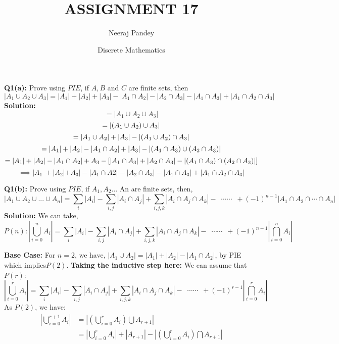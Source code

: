\documentclass{article}
\title{ASSIGNMENT 17}
\author{Neeraj Pandey}
\date{Discrete Mathematics}
\begin{document}
\maketitle
\begin{flushleft}
	\newcommand\tab[1][1cm]{\hspace*{#1}}
	\textbf{Q1(a): }Prove using $PIE$, if $A,B$ and $C$ are finite sets, then
	\[ | A_{1} \cup A_{2} \cup A_{3} | = | A_{1} | + | A_{2} | + | A_{3} | - | A_{1} \cap A_{2} | - | A_{2} \cap A_{3} | - | A_{1} \cap A_{3} | + | A_{1} \cap A_{2} \cap A_{3} | \]
	\newline
	\newline
	\textbf{Solution: } \[ = |A_{1} \cup A_{2} \cup A_{3} |\]
	\[= | \small( A_{1} \cup A_{2} \small) \cup A_{3} |\]
	\[= | A_{1} \cup A_{2} | + | A_{3} | - | \small( A_{1} \cup A_{2} \small) \cap A_{3} |\]
	\[= |A_{1}| + |A_{2}| - |A_{1} \cap A_{2}| + |A_{3}| - | \small( A_{1} \cap A_{3} \small) \cup\small( A_{2} \cap A_{3} \small)| \]
	\[= |A_{1}| + |A_{2}| - |A_{1} \cap A_{2}| + A_{3} - \small[ |A_{1} \cap A_{3}| + |A_{2} \cap A_{3}| - |\small(A_{1} \cap A_{3} \small) \cap \small( A_{2} \cap A_{3}  \small)| \small]\]
	\[\implies |A_{1}\ + |A_{2}| +A_{3}| - |A_{1} \cap A{2}| - |A_{2} \cap A_{3}| - |A_{1} \cap A_{3}| +| A_{1} \cap A_{2} \cap A_{3}|\]
	\newline
	\newline
		
	\textbf{Q1(b): }Prove using $PIE$, if $A_{1}, A_{2} \dots$ An are finite sets, then,
	\newline
	\newline
	\[|A_{1}\cup  A_{2}\cup...\cup A_{n}|=\sum_{i} |A_{i}|-\sum_{i,j} |A_{i} \cap A_j| + \sum_{i,j,k}|A_{i} \cap A_{j} \cap A_{k}| - \enspace \cdots\cdots \enspace +(-1)^{n-1}|A_{1}\cap  A_{2}\cap \cdots \cap A_{n}|\]
	\newline
	\newline
	\textbf{Solution: } 
	We can take, \[P(n) :|\bigcup_{i=0}^{n}A_i|=\sum_{i} |A_i|-\sum_{i,j} |A_i \cap A_j| + \sum_{i,j,k}|A_i \cap A_j \cap A_k| - \enspace \cdots\cdots\enspace +(-1)^{n-1}|\bigcap_{i=0}^{n}A_i|\]
		
	\textbf{Base Case:} For $n=2$, we have, $|A_{1}\cup A_{2} | = |A_{1} | + | A_{2} | - | A_{1} \cap A_{2} |$, by PIE which implies$P(2)$.
	\newline
	\newline
	\textbf{Taking the inductive step here: } We can assume that $P(r)$:
	\[|\bigcup_{i=0}^{r}A_{i}| = \sum_{i} | A_{i} | - \sum_{i,j} | A_{i} \cap A_{j} | + \sum_{i,j,k} | A_{i} \cap A_{j} \cap A_{k}| - \enspace \cdots\cdots \enspace +(-1)^{r-1}|\bigcap_{i=0}^{r}A_{i}|\]
	As $P(2)$, we have:
	\begin{align*}
		|\bigcup_{i=0}^{r+1} A_{i}| & =|(\bigcup_{i=0}^{r}A_{i})\bigcup A_{r+1}|                                    \\
		                            & =|\bigcup_{i=0}^{r}A_{i}|+|A_{r+1}|-|(\bigcup_{i=0}^{r}A_{i})\bigcap A_{r+1}| 
	\end{align*}
		

\end{flushleft}
\end{document}
